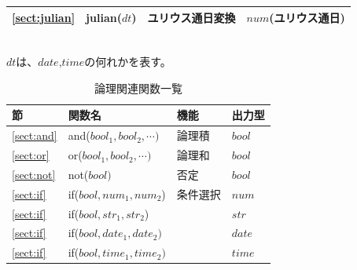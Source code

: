 \begin{table}[!hb]
\begin{center}
{\begin{tabular}{l|l|l|l}


\ref{sect:julian}& julian($dt$)&
ユリウス通日変換&$num$(ユリウス通日)\\




\hline
  \end{tabular}
	\\$dt$は、$date$,$time$の何れかを表す。
  }
  \end{center}
\end{table}

\begin{table}[!hb]
\begin{center}
\caption{論理関連関数一覧\label{tbl:mcal_logical}}
{\small
  \begin{tabular}{l|l|l|l} \hline
節&関数名&機能&出力型\\ \hline

\ref{sect:and}& and($bool_1,bool_2,\cdots)$& 論理積 &$bool$\\
\ref{sect:or}& or($bool_1,bool_2,\cdots)$  & 論理和 &$bool$\\
\ref{sect:not}& not($bool)$                & 否定   &$bool$\\
\hline
\ref{sect:if}& if($bool,num_1,num_2$)      &条件選択& $num$\\
\ref{sect:if}& if($bool,str_1,str_2$)      &        & $str$\\
\ref{sect:if}& if($bool,date_1,date_2)$    &        & $date$\\
\ref{sect:if}& if($bool,time_1,time_2)$    &        & $time$\\

\hline
  \end{tabular}
  }
  \end{center}
\end{table}

